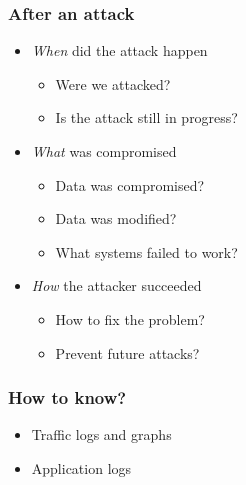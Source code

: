 \begin{frame}
\frametitle{After an attack}
\begin{itemize}
\item \emph{When} did the attack happen
	\begin{itemize}
	\item Were we attacked?
	\item Is the attack still in progress?
	\end{itemize}
\item \emph{What} was compromised
	\begin{itemize}
	\item Data was compromised?
	\item Data was modified?
	\item What systems failed to work?
	\end{itemize}
\item \emph{How} the attacker succeeded
	\begin{itemize}
	\item How to fix the problem?
	\item Prevent future attacks?
	\end{itemize}
\end{itemize}
\end{frame}

\begin{frame}
\frametitle{How to know?}
\begin{itemize}
\item Traffic logs and graphs
\item Application logs
\end{itemize}
\begin{columns}
\begin{column}{0.5\textwidth}
\end{column}
\begin{column}{0.5\textwidth}
\end{column}
\end{columns}
\end{frame}

